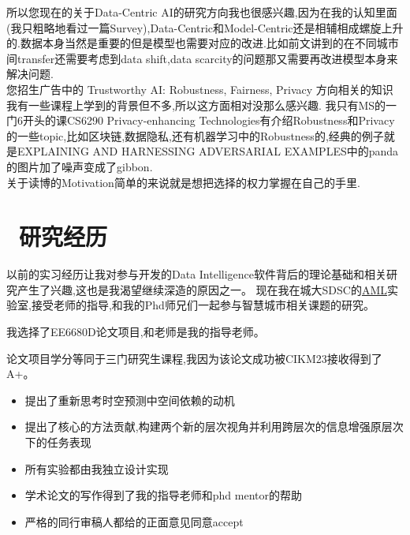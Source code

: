 \documentclass{resume}
\begin{document}
所以您现在的关于Data-Centric AI的研究方向我也很感兴趣,因为在我的认知里面(我只粗略地看过一篇Survey),Data-Centric和Model-Centric还是相辅相成螺旋上升的.数据本身当然是重要的但是模型也需要对应的改进.比如前文讲到的在不同城市间transfer还需要考虑到data shift,data scarcity的问题那又需要再改进模型本身来解决问题.\\

您招生广告中的 Trustworthy AI: Robustness, Fairness, Privacy 方向相关的知识我有一些课程上学到的背景但不多,所以这方面相对没那么感兴趣.
我只有MS的一门6开头的课CS6290	Privacy-enhancing Technologies有介绍Robustness和Privacy的一些topic,比如区块链,数据隐私,还有机器学习中的Robustness的,经典的例子就是EXPLAINING AND HARNESSING ADVERSARIAL EXAMPLES中的panda的图片加了噪声变成了gibbon.\\

关于读博的Motivation简单的来说就是想把选择的权力掌握在自己的手里.

\section{\faUsers\ 研究经历}

以前的实习经历让我对参与开发的Data Intelligence软件背后的理论基础和相关研究产生了兴趣,这也是我渴望继续深造的原因之一。
现在我在城大SDSC的\href{https://aml-cityu.github.io/team/}{AML}实验室,接受\href{https://www.cityu.edu.hk/stfprofile/xyzhao.htm}{\color{blue}{赵翔宇}}老师的指导,和我的Phd师兄们一起参与智慧城市相关课题的研究。



我选择了EE6680D论文项目,\href{https://www.cityu.edu.hk/stfprofile/haoliali.htm}{\color{blue}{李皓亮}}和\href{https://www.cityu.edu.hk/stfprofile/xyzhao.htm}{\color{blue}{赵翔宇}}老师是我的指导老师。

论文项目学分等同于三门研究生课程,我因为该论文成功被CIKM23接收得到了A+。
\begin{itemize}
 \item 提出了重新思考时空预测中空间依赖的动机
 \item 提出了核心的方法贡献,构建两个新的层次视角并利用跨层次的信息增强原层次下的任务表现
 \item 所有实验都由我独立设计实现
 \item 学术论文的写作得到了我的指导老师和phd mentor的帮助
 \item 严格的同行审稿人都给的正面意见同意accept
\end{itemize}
\end{document}
